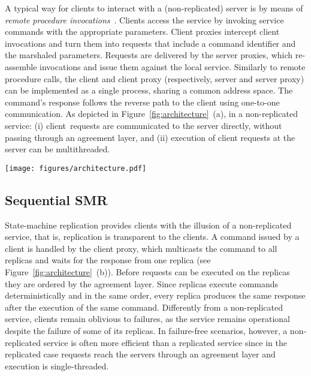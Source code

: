 \documentclass[conference]{IEEEtran}
\newcommand{\sizefactor}{0.9}
\begin{document}
A typical way for clients to interact with a (non-replicated) server is by means of \emph{remote procedure invocations}~\cite{BN84,tanenbaum1995distributed}. Clients access the service by invoking service commands with the appropriate parameters. 
Client proxies intercept client invocations and turn them into requests that include a command identifier and the marshaled parameters. 
Requests are delivered by the server proxies, which re-assemble invocations and issue them against the local service. 
Similarly to remote procedure calls, the client and client proxy (respectively, server and server proxy) can be implemented as a single process, sharing a common address space. 
The command's response follows the reverse path to the client using one-to-one communication. 
As depicted in Figure~\ref{fig:architecture}~(a), in a non-replicated service: (i) client~requests are communicated to the server directly, without passing through an agreement layer, and (ii) execution of client requests at the server can be multithreaded. 

\begin{figure*}[ht]
  \begin{center}
      \texttt{[image: figures/architecture.pdf]} 
    \caption{Architecture differences among (a) non-replicated service, (b) sequential state-machine-replication, (c) pipelined state-machine replication, (d) sequential delivery-parallel execution (SDPE), (e) execute-verify, and (f) parallel delivery-parallel execution. Agreement layer and replicas are fault-tolerant.}
        \label{fig:architecture}
  \end{center}
\end{figure*}

\subsection{Sequential SMR}
\label{sec:seqsmr}





State-machine replication provides clients with the illusion of a non-replicated service, that is, replication is transparent to the clients.
A command issued by a client is handled by the client proxy, which multicasts the command to all replicas and waits for the response from one replica (see Figure~\ref{fig:architecture}~(b)). Before requests can be executed on the replicas they are ordered by the agreement layer. Since replicas execute commands deterministically and in the same order, every replica produces the same response after the execution of the same command.
Differently from a non-replicated service, clients remain oblivious to failures, as the service remains operational despite the failure of some of its replicas. 
In failure-free scenarios, however, a non-replicated service is often more efficient than a replicated service since in the replicated case requests reach the servers through an agreement layer and execution is single-threaded. 
\end{document}
